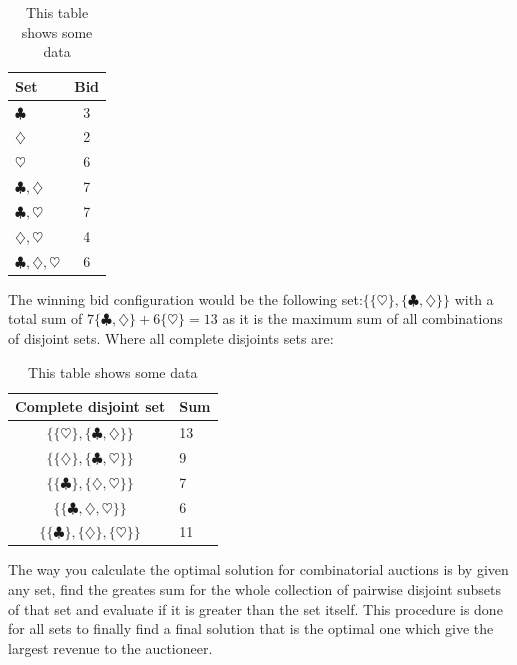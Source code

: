 \documentclass[a4paper, 12pt]{report}
\begin{document}
\begin{table}[htb]
\centering
\begin{tabular}{ l | c}
\hline  
Set & Bid \\
\hline
$\clubsuit$ & 3 \\
$\diamondsuit$ & 2 \\
$\heartsuit$ & 6 \\
$\clubsuit, \diamondsuit$ & 7 \\
$\clubsuit, \heartsuit$ & 7 \\
$\diamondsuit, \heartsuit$ & 4 \\
$\clubsuit, \diamondsuit, \heartsuit$ & 6 \\
\end{tabular}
\caption{This table shows some data}
\label{tab:bids}
\end{table}
The winning bid configuration would be the following set:$ \{\{\heartsuit\},\{\clubsuit , \diamondsuit\}\}$ 
with a total sum of $7 \{\clubsuit , \diamondsuit\}+6 \{\heartsuit\} = 13$ as it is the maximum sum of all combinations of disjoint sets. Where all complete disjoints sets are:

\begin{table}[htb]
\centering
\begin{tabular}{c | l }
\hline
Complete disjoint set & Sum\\
\hline
$\{\{\heartsuit \},\{\clubsuit , \diamondsuit \}\} $ & 13 \\
$\{\{\diamondsuit \},\{\clubsuit , \heartsuit \}\} $ & 9 \\
$\{\{\clubsuit \},\{\diamondsuit , \heartsuit \}\} $ & 7 \\

$\{\{\clubsuit,\diamondsuit , \heartsuit \}\} $ & 6 \\
$\{\{\clubsuit \},\{\diamondsuit \}, \{ \heartsuit \}\} $ &  11
\end{tabular}
\caption{This table shows some data}
\label{tab:disjoint}
\end{table}

The way you calculate the optimal solution for combinatorial auctions is by given any set, 
find the greates sum for the whole collection of pairwise disjoint subsets of that set and evaluate if it is greater than the set itself.
This procedure is done for all sets to finally find a final solution that is the optimal one which give the largest revenue to the auctioneer.
\end{document}
